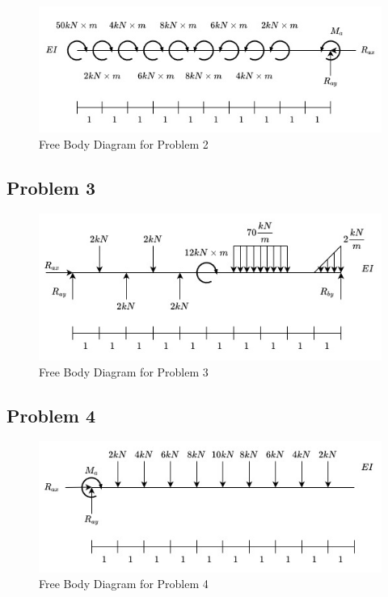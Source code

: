 \documentclass[a4paper]{article}
\begin{document}
\begin{figure}[h]
\includegraphics[width=\textwidth]{FBD/FBD_2.jpg}
\caption{Free Body Diagram for Problem 2}
\label{FBD_2}
\end{figure}

\subsection{Problem 3}

\begin{figure}[h]
\includegraphics[width=\textwidth]{FBD/FBD_3.jpg}
\caption{Free Body Diagram for Problem 3}
\label{FBD_3}
\end{figure}

\subsection{Problem 4}

\begin{figure}[h]
\includegraphics[width=\textwidth]{FBD/FBD_4.jpg}
\caption{Free Body Diagram for Problem 4}
\label{FBD_4}
\end{figure}
\end{document}

